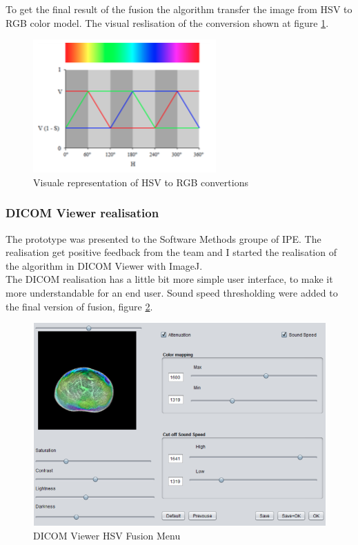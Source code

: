 \documentclass[english]{article}
\begin{document}
To get the final result of the fusion the algorithm transfer the image from HSV to RGB color model. The visual reslisation of the conversion shown at figure \ref{fig:hsv2rgb}.

\begin{figure}[H]
\centerline{\includegraphics[scale=0.6]{internship_report/hsv2rgb}}
\caption{Visuale representation of HSV to RGB convertions\label{fig:hsv2rgb}}
\end{figure}

\subsubsection{DICOM Viewer realisation}

The prototype was presented to the Software Methods groupe of IPE. The realisation get positive feedback from the team and I started the realisation of the algorithm in DICOM Viewer with ImageJ.\\

The DICOM realisation has a little bit more simple user interface, to make it more understandable for an end user. Sound speed thresholding were added to the final version of fusion, figure \ref{fig:final}.

\begin{figure}[H]
\centerline{\includegraphics[scale=0.5]{internship_report/final}}
\caption{DICOM Viewer HSV Fusion Menu \label{fig:final}}
\end{figure}
\end{document}

